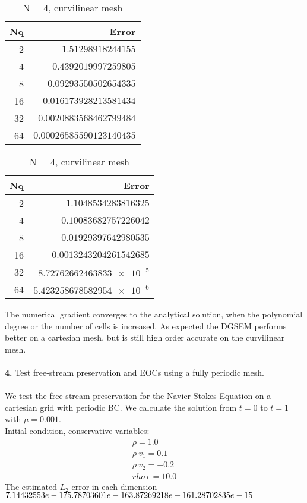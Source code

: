 \documentclass[11pt]{scrartcl}
\begin{document}
\begin{table}[H]
	\parbox{.45\linewidth}{
		\centering
		\begin{tabular}{|r|r|}
			\hline\hline
			\textbf{Nq} & \textbf{Error} \\\hline
			2 & $\num{1.51298918244155}$   \\
			4 & $\num{0.4392019997259805}$  \\
			8 & $\num{0.09293550502654335}$ \\
			16 & $\num{0.016173928213581434}$ \\
			32 & $\num{0.0020883568462799484}$ \\
			64 & $\num{0.00026585590123140435}$ \\\hline
		\end{tabular}
		\caption{N = $3$, curvilinear mesh}
	}
	\hspace{0.5cm}
	\parbox{.45\linewidth}{
		\centering
		\begin{tabular}{|r|r|}
			\hline\hline
			\textbf{Nq} & \textbf{Error} \\\hline
			2 & $\num{1.1048534283816325}$   \\
			4 & $\num{0.10083682757226042}$  \\
			8 & $\num{0.01929397642980535}$ \\
			16 & $\num{0.0013243204261542685}$ \\
			32 & $\num{8.72762662463833e-5}$ \\
			64 & $\num{5.423258678582954e-6}$ \\\hline
		\end{tabular}
		\caption{N = $4$, curvilinear mesh}
	}
\end{table}
The numerical gradient converges to the analytical solution, when the polynomial degree or the number of cells is increased. As expected the DGSEM performs better on a cartesian mesh, but is still high order accurate on the curvilinear mesh. \\ \ \\

\textbf{4.} Test free-stream preservation and EOCs using a fully periodic mesh.\\
\\
We test the free-stream preservation for the Navier-Stokes-Equation on a cartesian grid with periodic BC.
We calculate the solution from $t=0$ to $t=1$ with $\mu = 0.001$.\\
Initial condition, conservative variables:
\begin{align*}
	\rho = 1.0 \\
  	\rho \ v_1 = 0.1 \\
  	\rho \ v_2 = -0.2 \\
  	rho \ e = 10.0
\end{align*}
The estimated $L_2$ error in each dimension \\
$ 7.14432553e-17 \\ 5.78703601e-16\\ 3.87269218e-16  \\ 1.28702835e-15$ \\
\end{document}
